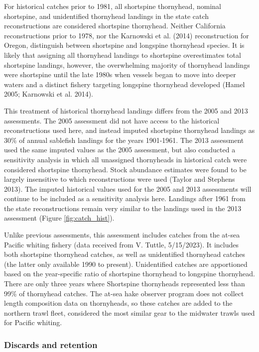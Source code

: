 \documentclass[11pt,
  english,
  letterpaper,
]{article}
\begin{document}
For historical catches prior to 1981, all shortspine thornyhead, nominal shortspine, and unidentified thornyhead landings in the state catch reconstructions are considered shortspine thornyhead. Neither California reconstructions prior to 1978, nor the Karnowski et al. (2014) reconstruction for Oregon, distinguish between shortspine and longspine thornyhead species. It is likely that assigning all thornyhead landings to shortspine overestimates total shortspine landings, however, the overwhelming majority of thornyhead landings were shortspine until the late 1980s when vessels began to move into deeper waters and a distinct fishery targeting longspine thornyhead developed (Hamel 2005; Karnowski et al. 2014).

This treatment of historical thornyhead landings differs from the 2005 and 2013 assessments. The 2005 assessment did not have access to the historical reconstructions used here, and instead imputed shortspine thornyhead landings as 30\% of annual sablefish landings for the years 1901-1961. The 2013 assessment used the same imputed values as the 2005 assessment, but also conducted a sensitivity analysis in which all unassigned thornyheads in historical catch were considered shortspine thornyhead. Stock abundance estimates were found to be largely insensitive to which reconstructions were used (Taylor and Stephens 2013). The imputed historical values used for the 2005 and 2013 assessments will continue to be included as a sensitivity analysis here. Landings after 1961 from the state reconstructions remain very similar to the landings used in the 2013 assessment (Figure \ref{fig:catch_hist}).

Unlike previous assessments, this assessment includes catches from the at-sea Pacific whiting fishery (data received from V. Tuttle, 5/15/2023). It includes both shortspine thornyhead catches, as well as unidentified thornyhead catches (the latter only available 1990 to present). Unidentified catches are apportioned based on the year-specific ratio of shortspine thornyhead to longspine thornyhead. There are only three years where Shortspine thornyheads represented less than 99\% of thornyhead catches. The at-sea hake observer program does not collect length composition data on thornyheads, so these catches are added to the northern trawl fleet, considered the most similar gear to the midwater trawls used for Pacific whiting.

\hypertarget{discards-and-retention}{%
\subsubsection{Discards and retention}\label{discards-and-retention}}
\end{document}
